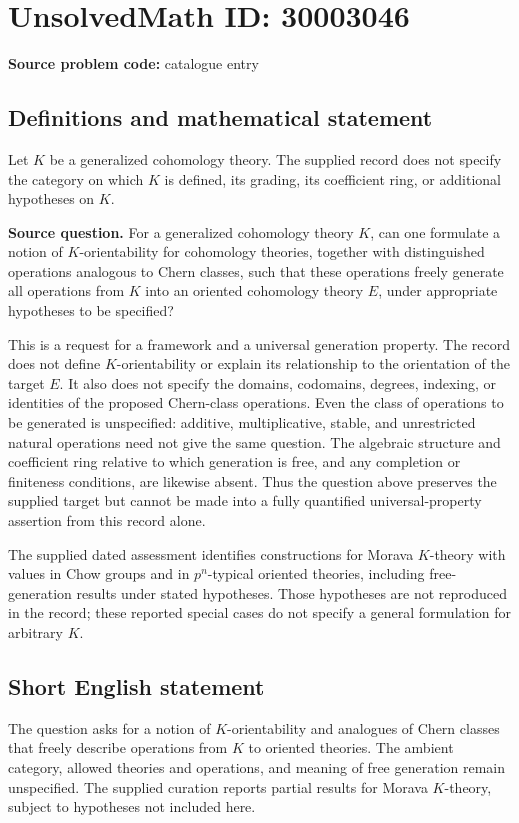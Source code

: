\documentclass[11pt]{article}
\begin{document}
\section*{UnsolvedMath ID: 30003046}
\textbf{Source problem code:} catalogue entry
\subsection{Definitions and mathematical statement}
Let \(K\) be a generalized cohomology theory. The supplied record does not specify the category on which \(K\) is defined, its grading, its coefficient ring, or additional hypotheses on \(K\).

\textbf{Source question.} For a generalized cohomology theory \(K\), can one formulate a notion of \(K\)-orientability for cohomology theories, together with distinguished operations analogous to Chern classes, such that these operations freely generate all operations from \(K\) into an oriented cohomology theory \(E\), under appropriate hypotheses to be specified?

This is a request for a framework and a universal generation property. The record does not define \(K\)-orientability or explain its relationship to the orientation of the target \(E\). It also does not specify the domains, codomains, degrees, indexing, or identities of the proposed Chern-class operations. Even the class of operations to be generated is unspecified: additive, multiplicative, stable, and unrestricted natural operations need not give the same question. The algebraic structure and coefficient ring relative to which generation is free, and any completion or finiteness conditions, are likewise absent. Thus the question above preserves the supplied target but cannot be made into a fully quantified universal-property assertion from this record alone.

The supplied dated assessment identifies constructions for Morava \(K\)-theory with values in Chow groups and in \(p^n\)-typical oriented theories, including free-generation results under stated hypotheses. Those hypotheses are not reproduced in the record; these reported special cases do not specify a general formulation for arbitrary \(K\).
\subsection{Short English statement}
The question asks for a notion of \(K\)-orientability and analogues of Chern classes that freely describe operations from \(K\) to oriented theories. The ambient category, allowed theories and operations, and meaning of free generation remain unspecified. The supplied curation reports partial results for Morava \(K\)-theory, subject to hypotheses not included here.
\end{document}
